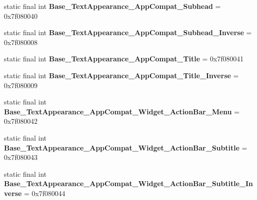 \begin{DoxyCompactItemize}
\item 
\hypertarget{classandroid_1_1support_1_1v7_1_1appcompat_1_1_r_1_1style_a0a4cf7b167f6f4d59fbfbcd4d755e48c}{}static final int {\bfseries Base\+\_\+\+Text\+Appearance\+\_\+\+App\+Compat\+\_\+\+Subhead} = 0x7f080040\label{classandroid_1_1support_1_1v7_1_1appcompat_1_1_r_1_1style_a0a4cf7b167f6f4d59fbfbcd4d755e48c}

\item 
\hypertarget{classandroid_1_1support_1_1v7_1_1appcompat_1_1_r_1_1style_aa148f2da1dd47d8c68ab864b270466ce}{}static final int {\bfseries Base\+\_\+\+Text\+Appearance\+\_\+\+App\+Compat\+\_\+\+Subhead\+\_\+\+Inverse} = 0x7f080008\label{classandroid_1_1support_1_1v7_1_1appcompat_1_1_r_1_1style_aa148f2da1dd47d8c68ab864b270466ce}

\item 
\hypertarget{classandroid_1_1support_1_1v7_1_1appcompat_1_1_r_1_1style_aa5988904fde7a159365b0ae10f2ae9ac}{}static final int {\bfseries Base\+\_\+\+Text\+Appearance\+\_\+\+App\+Compat\+\_\+\+Title} = 0x7f080041\label{classandroid_1_1support_1_1v7_1_1appcompat_1_1_r_1_1style_aa5988904fde7a159365b0ae10f2ae9ac}

\item 
\hypertarget{classandroid_1_1support_1_1v7_1_1appcompat_1_1_r_1_1style_a6ce7242b318c13a6a38d536cae248d89}{}static final int {\bfseries Base\+\_\+\+Text\+Appearance\+\_\+\+App\+Compat\+\_\+\+Title\+\_\+\+Inverse} = 0x7f080009\label{classandroid_1_1support_1_1v7_1_1appcompat_1_1_r_1_1style_a6ce7242b318c13a6a38d536cae248d89}

\item 
\hypertarget{classandroid_1_1support_1_1v7_1_1appcompat_1_1_r_1_1style_aa05f850bb2a20365f1c92a78dc494e63}{}static final int {\bfseries Base\+\_\+\+Text\+Appearance\+\_\+\+App\+Compat\+\_\+\+Widget\+\_\+\+Action\+Bar\+\_\+\+Menu} = 0x7f080042\label{classandroid_1_1support_1_1v7_1_1appcompat_1_1_r_1_1style_aa05f850bb2a20365f1c92a78dc494e63}

\item 
\hypertarget{classandroid_1_1support_1_1v7_1_1appcompat_1_1_r_1_1style_a2a6e58456861211a5d6739236375d39c}{}static final int {\bfseries Base\+\_\+\+Text\+Appearance\+\_\+\+App\+Compat\+\_\+\+Widget\+\_\+\+Action\+Bar\+\_\+\+Subtitle} = 0x7f080043\label{classandroid_1_1support_1_1v7_1_1appcompat_1_1_r_1_1style_a2a6e58456861211a5d6739236375d39c}

\item 
\hypertarget{classandroid_1_1support_1_1v7_1_1appcompat_1_1_r_1_1style_a7307f49dc5cf0eee3154ce160a6f4ff7}{}static final int {\bfseries Base\+\_\+\+Text\+Appearance\+\_\+\+App\+Compat\+\_\+\+Widget\+\_\+\+Action\+Bar\+\_\+\+Subtitle\+\_\+\+Inverse} = 0x7f080044\label{classandroid_1_1support_1_1v7_1_1appcompat_1_1_r_1_1style_a7307f49dc5cf0eee3154ce160a6f4ff7}


\end{DoxyCompactItemize}
